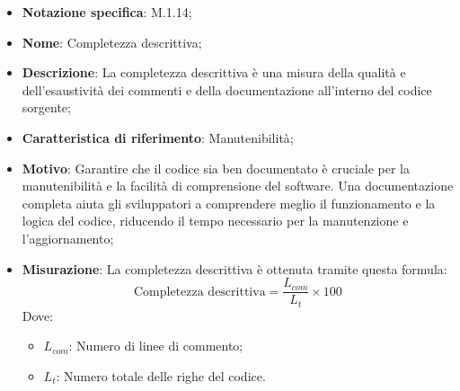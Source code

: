 \begin{itemize}
    \item \textbf{Notazione specifica}: M.1.14;
    \item \textbf{Nome}: Completezza descrittiva;
    \item \textbf{Descrizione}: La completezza descrittiva è una misura della qualità e dell'esaustività dei commenti e della documentazione all'interno del codice sorgente;
    \item \textbf{Caratteristica di riferimento}: Manutenibilità;
    \item \textbf{Motivo}: Garantire che il codice sia ben documentato è cruciale per la manutenibilità e la facilità di comprensione del software. Una documentazione completa aiuta gli sviluppatori a comprendere meglio il funzionamento e la logica del codice, riducendo il tempo necessario per la manutenzione e l'aggiornamento;
    \item \textbf{Misurazione}: La completezza descrittiva è ottenuta tramite questa formula:
    \[
    \text{Completezza descrittiva} = \frac{L_{com}}{L_{t}} \times 100
    \]
    Dove:
    \begin{itemize}
        \item $L_{com}$: Numero di linee di commento;
        \item $L_{t}$: Numero totale delle righe del codice.
    \end{itemize}
\end{itemize}
